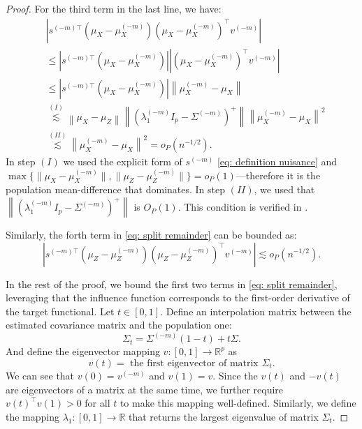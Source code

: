 \documentclass[11pt]{article}
\begin{document}
\begin{proof}
For the third term in the last line, we have:
\begin{equation}
    \begin{aligned}\label{eq: simple X term}
        & \left|s^{(-m)\top}\left(\mu_X-\mu_X^{(-m)}\right)\left(\mu_X-\mu_X^{(-m)}\right)^{\top} v^{(-m)}\right|\\
        & \leq \left|s^{(-m) \top}\left(\mu_X-\mu_X^{(-m)}\right)\right| \left|\left(\mu_X-\mu_X^{(-m)}\right)^{\top} v^{(-m)}\right|\\
        & \leq \left|s^{(-m) \top}\left(\mu_X-\mu_X^{(-m)}\right)\right| \left\|\mu_X^{(-m)}-\mu_X\right\| \\
        &\stackrel{(I)}{\lesssim} \left\|\mu_X-\mu_Z\right\|\left\|\left(\lambda_1^{(-m)} I_p-\Sigma^{(-m)}\right)^{+}\right\|\left\|\mu_X^{(-m)}-\mu_X\right\|^2\\
        & \stackrel{(II)}{\lesssim} \left\|\mu_X^{(-m)}-\mu_X\right\|^2 = o_P(n^{-1/2}).
    \end{aligned}
\end{equation}
In step $(I)$ we used the explicit form of $s^{(-m)}$ \eqref{eq: definition nuisance} and $\max\{\|\mu_X - \mu_X^{(-m)}\|, \|\mu_Z - \mu_Z^{(-m)}\|\} = o_P(1)$---therefore it is the population mean-difference that dominates. In step $(II)$, we used that $\left\|\left(\lambda_1^{(-m)} I_p-\Sigma^{(-m)}\right)^{+}\right\|$ is $O_P(1)$. This condition is verified in .

Similarly, the forth term in \eqref{eq: split remainder} can be bounded as:
\begin{equation}\label{eq: simple Z term}
\left|s^{(-m)\top}\left(\mu_Z-\mu_Z^{(-m)}\right)\left(\mu_Z-\mu_Z^{(-m)}\right)^{\top} v^{(-m)}\right| \lesssim o_P(n^{-1/2}).
\end{equation}

In the rest of the proof, we bound the first two terms in \eqref{eq: split remainder}, leveraging that the influence function corresponds to the first-order derivative of the target functional. Let $t \in[0,1]$. Define an interpolation matrix between the estimated covariance matrix and the population one:
\begin{equation*}
\Sigma_t= \Sigma^{(-m)}(1-t)+t \Sigma.
\end{equation*}
And define the eigenvector mapping $v:[0,1] \rightarrow \mathbb{R}^p$ as
\begin{equation*}
v(t)=\text { the first eigenvector of matrix } \Sigma_t \text {.}
\end{equation*}
We can see that $v(0)=v^{(-m)}$ and $v(1)=v$. Since the $v(t)$ and $-v(t)$ are eigenvectors of a matrix at the same time, we further require $v(t)^\top v(1) > 0$ for all $t$ to make this mapping well-defined. Similarly, we define the mapping $\lambda_1: [0,1]\rightarrow \mathbb{R}$ that returns the largest eigenvalue of matrix $\Sigma_t$.


\end{proof}
\end{document}
